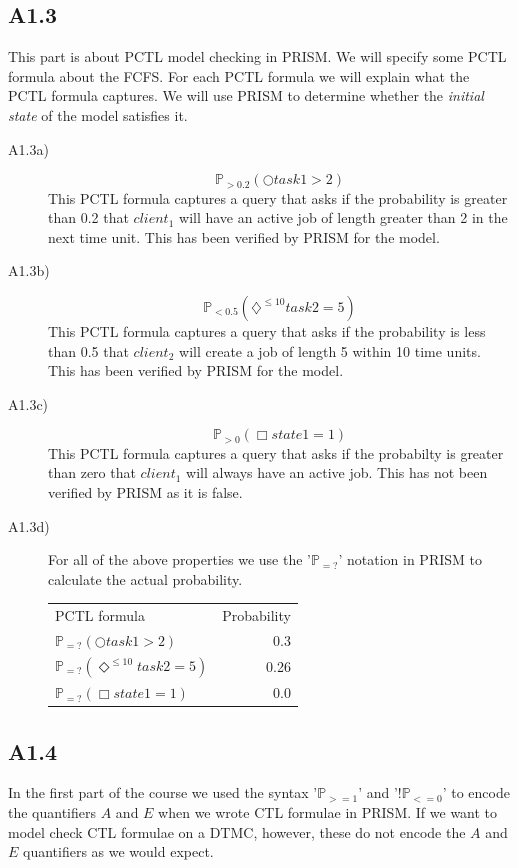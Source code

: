 \documentclass[12pt]{report}
\begin{document}
\subsection*{A1.3}
This part is about PCTL model checking in PRISM. We will specify some PCTL formula about the FCFS. For each PCTL formula we will explain what the PCTL formula captures. We will use PRISM to determine whether the \emph{initial state} of the model satisfies it.

\begin{description}
\item[A1.3a)] $$\mathbb{P}_{> 0.2}(\bigcirc task1 > 2)$$
This PCTL formula captures a query that asks if the probability is greater than 0.2 that $client_1$ will have an active job of length greater than 2 in the next time unit. This has been verified by PRISM for the model.


\item[A1.3b)] $$\mathbb{P}_{< 0.5}(\diamondsuit^{\leq 10} task2=5)$$
This PCTL formula captures a query that asks if the probability is less than 0.5 that $client_2$ will create a job of length 5 within 10 time units. This has been verified by PRISM for the model.


\item[A1.3c)] $$\mathbb{P}_{> 0}(\Box state1=1)$$
This PCTL formula captures a query that asks if the probabilty is greater than zero that $client_1$ will always have an active job. This has not been verified by PRISM as it is false.


\item[A1.3d)] For all of the above properties we use the '$\mathbb{P}_{=?}$' notation in PRISM to calculate the actual probability.
\begin{center}
\begin{tabular}{l r}
PCTL formula & Probability\\
$\mathbb{P}_{=?}(\bigcirc task1> 2)$ & 0.3\\
$\mathbb{P}_{=?}(\Diamond^{\leq10} task2=5)$ & 0.26\\
$\mathbb{P}_{=?}(\Box state1=1)$ & 0.0\\
\end{tabular}
\end{center}

\end{description}

\subsection*{A1.4}
In the first part of the course we used the syntax '$\mathbb{P}_{>=1}$' and '$!\mathbb{P}_{<=0}$' to encode the quantifiers $A$ and $E$ when we wrote CTL formulae in PRISM. If we want to model check CTL formulae on a DTMC, however, these do not encode the $A$ and $E$ quantifiers as we would expect.
\end{document}
